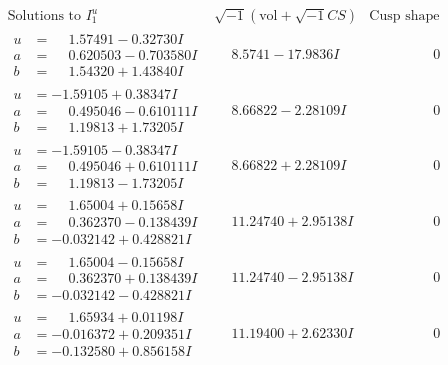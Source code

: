 \documentclass[1p]{elsarticle_modified}
\theoremstyle{definition}
\newcommand{\I}{\sqrt{-1}}
\begin{document}
$$\begin{array}{c|c|c}
\text{Solutions to }I^u_{1}& \I (\text{vol} + \sqrt{-1}CS) & \text{Cusp shape}\\
 \hline 
\begin{aligned}
u &= \phantom{-}1.57491 - 0.32730 I \\
a &= \phantom{-}0.620503 - 0.703580 I \\
b &= \phantom{-}1.54320 + 1.43840 I\end{aligned}
 & \phantom{-}8.5741 - 17.9836 I & \phantom{-0.000000 } 0 \\ \hline\begin{aligned}
u &= -1.59105 + 0.38347 I \\
a &= \phantom{-}0.495046 - 0.610111 I \\
b &= \phantom{-}1.19813 + 1.73205 I\end{aligned}
 & \phantom{-}8.66822 - 2.28109 I & \phantom{-0.000000 } 0 \\ \hline\begin{aligned}
u &= -1.59105 - 0.38347 I \\
a &= \phantom{-}0.495046 + 0.610111 I \\
b &= \phantom{-}1.19813 - 1.73205 I\end{aligned}
 & \phantom{-}8.66822 + 2.28109 I & \phantom{-0.000000 } 0 \\ \hline\begin{aligned}
u &= \phantom{-}1.65004 + 0.15658 I \\
a &= \phantom{-}0.362370 - 0.138439 I \\
b &= -0.032142 + 0.428821 I\end{aligned}
 & \phantom{-}11.24740 + 2.95138 I & \phantom{-0.000000 } 0 \\ \hline\begin{aligned}
u &= \phantom{-}1.65004 - 0.15658 I \\
a &= \phantom{-}0.362370 + 0.138439 I \\
b &= -0.032142 - 0.428821 I\end{aligned}
 & \phantom{-}11.24740 - 2.95138 I & \phantom{-0.000000 } 0 \\ \hline\begin{aligned}
u &= \phantom{-}1.65934 + 0.01198 I \\
a &= -0.016372 + 0.209351 I \\
b &= -0.132580 + 0.856158 I\end{aligned}
 & \phantom{-}11.19400 + 2.62330 I & \phantom{-0.000000 } 0 \\ \hline\begin{aligned}

\end{aligned}
\end{array}$$
\end{document}
